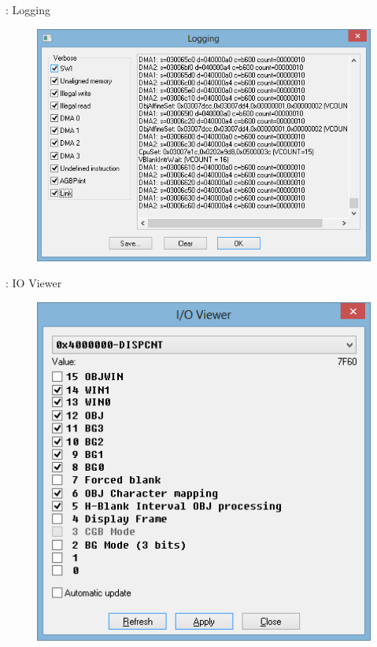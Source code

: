 \documentclass{beamer}
\begin{document}
\begin{darkframes}
\begin{frame}{\subsecname: Logging}
    \begin{figure}
        \centering
        \includegraphics[width=1\textwidth,height=0.5\textheight,keepaspectratio]{loggingview}
    \end{figure}
\end{frame}

\begin{frame}{\subsecname: IO Viewer}
    \begin{figure}
        \centering
        \includegraphics[width=1\textwidth,height=0.5\textheight,keepaspectratio]{ioview}
    \end{figure}
\end{frame}


\end{darkframes}
\end{document}

